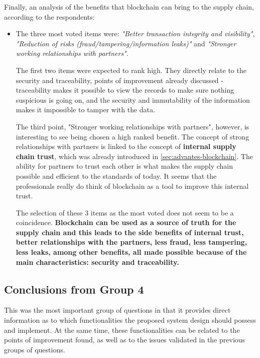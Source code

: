Finally, an analysis of the benefits that blockchain can bring to the supply chain, according to the respondents:

\begin{itemize}
    \item The three most voted items were: \textit{"Better transaction integrity and visibility"}, \textit{"Reduction of risks (fraud/tampering/information leaks)"} and \textit{"Stronger working relationships with partners"}.

    The first two items were expected to rank high. They directly relate to the security and traceability, points of improvement already discussed - traceability makes it possible to view the records to make sure nothing suspicious is going on, and the security and immutability of the information makes it impossible to tamper with the data.
    
    The third point, "Stronger working relationships with partners", however, is interesting to see being chosen a high ranked benefit. The concept of strong relationships with partners is linked to  the concept of \textbf{internal supply chain trust}, which was already introduced in \ref{sec:advantes-blockchain}. The ability for partners to trust each other is what makes the supply chain possible and efficient to the standards of today. It seems that the professionals really do think of blockchain as a tool to improve this internal trust.
    
    The selection of these 3 items as the most voted does not seem to be a coincidence. \textbf{Blockchain can be used as a source of truth for the supply chain and this leads to the side benefits of internal trust, better relationships with the partners, less fraud, less tampering, less leaks, among other benefits, all made possible because of the main characteristics: security and traceability.}
\end{itemize}

\subsection*{Conclusions from Group 4}

This was the most important group of questions in that it provides direct information as to which functionalities the proposed system design should possess and implement. At the same time, these functionalities can be related to the points of improvement found, as well as to the issues validated in the previous groups of questions.

